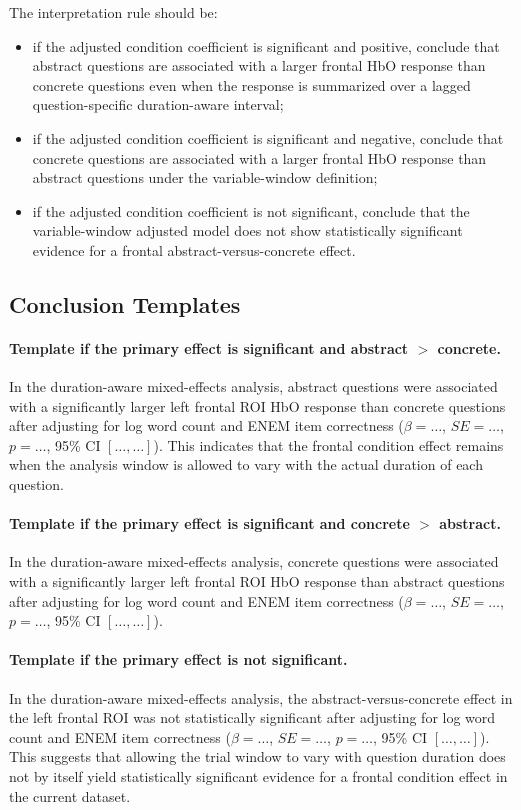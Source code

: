The interpretation rule should be:
\begin{itemize}
    \item if the adjusted condition coefficient is significant and positive, conclude that abstract
    questions are associated with a larger frontal HbO response than concrete questions even when
    the response is summarized over a lagged question-specific duration-aware interval;
    \item if the adjusted condition coefficient is significant and negative, conclude that concrete
    questions are associated with a larger frontal HbO response than abstract questions under the
    variable-window definition;
    \item if the adjusted condition coefficient is not significant, conclude that the variable-window
    adjusted model does not show statistically significant evidence for a frontal abstract-versus-concrete effect.
\end{itemize}

\subsection{Conclusion Templates}

\paragraph{Template if the primary effect is significant and abstract \(>\) concrete.}
In the duration-aware mixed-effects analysis, abstract questions were associated with a significantly
larger left frontal ROI HbO response than concrete questions after adjusting for log word count and
ENEM item correctness
(\(\beta=\ldots\), \(SE=\ldots\), \(p=\ldots\), 95\% CI \([\ldots,\ldots]\)).
This indicates that the frontal condition effect remains when the analysis window is allowed to vary
with the actual duration of each question.

\paragraph{Template if the primary effect is significant and concrete \(>\) abstract.}
In the duration-aware mixed-effects analysis, concrete questions were associated with a significantly
larger left frontal ROI HbO response than abstract questions after adjusting for log word count and
ENEM item correctness
(\(\beta=\ldots\), \(SE=\ldots\), \(p=\ldots\), 95\% CI \([\ldots,\ldots]\)).

\paragraph{Template if the primary effect is not significant.}
In the duration-aware mixed-effects analysis, the abstract-versus-concrete effect in the left frontal ROI
was not statistically significant after adjusting for log word count and ENEM item correctness
(\(\beta=\ldots\), \(SE=\ldots\), \(p=\ldots\), 95\% CI \([\ldots,\ldots]\)).
This suggests that allowing the trial window to vary with question duration does not by itself yield
statistically significant evidence for a frontal condition effect in the current dataset.

